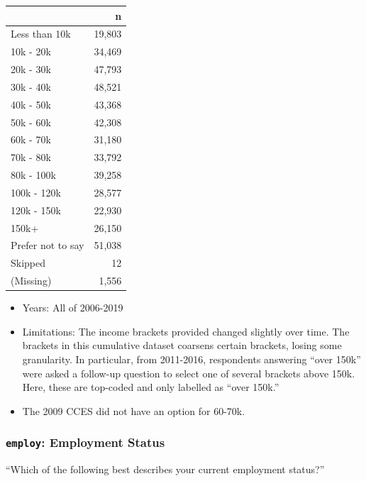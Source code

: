 \documentclass[10pt,article,oneside]{memoir}
\theoremstyle{definition}
\begin{document}
\begin{table}[H]
\centering
\begin{tabular}{lr}
\toprule
 & n\\
\midrule
Less than 10k & 19,803\\
10k - 20k & 34,469\\
20k - 30k & 47,793\\
30k - 40k & 48,521\\
40k - 50k & 43,368\\
50k - 60k & 42,308\\
60k - 70k & 31,180\\
70k - 80k & 33,792\\
80k - 100k & 39,258\\
100k - 120k & 28,577\\
120k - 150k & 22,930\\
150k+ & 26,150\\
Prefer not to say & 51,038\\
Skipped & 12\\
(Missing) & 1,556\\
\bottomrule
\end{tabular}
\end{table}

\begin{itemize}
\tightlist
\item
  Years: All of 2006-2019
\item
  Limitations: The income brackets provided changed slightly over time.
  The brackets in this cumulative dataset coarsens certain brackets,
  losing some granularity. In particular, from 2011-2016, respondents
  answering ``over 150k'' were asked a follow-up question to select one
  of several brackets above 150k. Here, these are top-coded and only
  labelled as ``over 150k.''
\item
  The 2009 CCES did not have an option for 60-70k.
\end{itemize}

\hypertarget{employ-employment-status}{%
\subsubsection{\texorpdfstring{\texttt{employ}: Employment
Status}{employ: Employment Status}}\label{employ-employment-status}}

``Which of the following best describes your current employment
status?''
\end{document}
